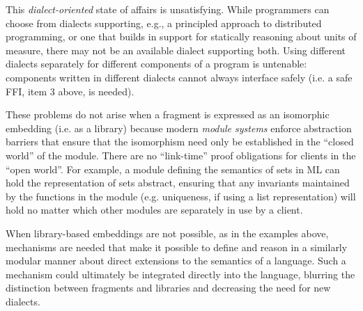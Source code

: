 \documentclass[10pt,preprint]{sigplanconf}
\begin{document}
This \emph{dialect-oriented} state of affairs is unsatisfying. %
While programmers can choose from dialects supporting, e.g., a principled approach to distributed programming, or one that builds in support for statically reasoning about units of measure, there may not be an available dialect supporting both. Using different dialects separately for different components of a program is untenable: components written in different dialects cannot always interface safely (i.e. a safe FFI, item 3 above, is needed). 

These problems do not arise when a fragment is expressed as an isomorphic embedding (i.e. as a library) because modern \emph{module systems} enforce abstraction barriers that ensure that the isomorphism need only be established in the ``closed world'' of the module. There are no ``link-time'' proof obligations for clients in the ``open world''. For example, a module defining the semantics of sets in ML can hold the representation of sets abstract, ensuring that any invariants maintained by the functions in the module (e.g. uniqueness, if using a list representation) will hold no matter which other modules are separately in use by a client. %

When library-based embeddings are not possible, as in the examples above, mechanisms are needed that make it possible to define and  reason in a similarly modular manner about  direct extensions to the semantics of a language. Such a mechanism could ultimately be integrated directly into the language, blurring the distinction between fragments and libraries and decreasing the need for new dialects.%
\end{document}
